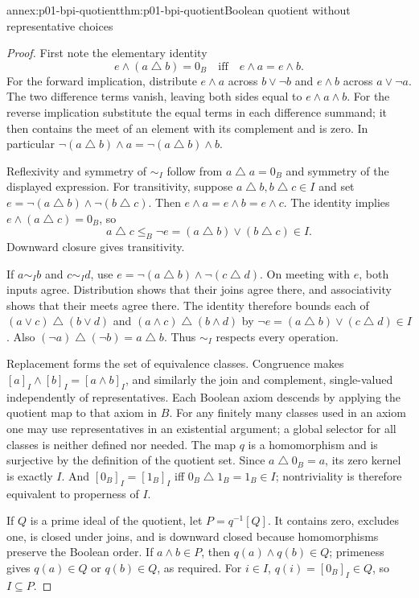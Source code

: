 \begin{annexitem}{annex:p01-bpi-quotient}{thm:p01-bpi-quotient}{Boolean quotient without representative choices}
\begin{proof}
First note the elementary identity
\[
 e\wedge(a\mathbin{\triangle}b)=0_B
 \quad\text{iff}\quad e\wedge a=e\wedge b.
\]
For the forward implication, distribute \(e\wedge a\) across
\(b\vee\neg b\) and \(e\wedge b\) across \(a\vee\neg a\).
The two difference terms vanish, leaving both sides equal to
\(e\wedge a\wedge b\). For the reverse implication substitute the
equal terms in each difference summand; it then contains the meet of an
element with its complement and is zero. In particular
\(\neg(a\mathbin{\triangle}b)\wedge a
=\neg(a\mathbin{\triangle}b)\wedge b\).

Reflexivity and symmetry of \(\sim_I\) follow from
\(a\mathbin{\triangle}a=0_B\) and symmetry of the displayed
expression. For transitivity, suppose
\(a\mathbin{\triangle}b,b\mathbin{\triangle}c\in I\) and set
\(e=\neg(a\mathbin{\triangle}b)\wedge
       \neg(b\mathbin{\triangle}c)\).
Then \(e\wedge a=e\wedge b=e\wedge c\). The identity implies
\(e\wedge(a\mathbin{\triangle}c)=0_B\), so
\[
 a\mathbin{\triangle}c\leq_B\neg e
  =(a\mathbin{\triangle}b)\vee(b\mathbin{\triangle}c)\in I.
\]
Downward closure gives transitivity.

If \(a\sim_I b\) and \(c\sim_I d\), use
\(e=\neg(a\mathbin{\triangle}b)\wedge
       \neg(c\mathbin{\triangle}d)\).
On meeting with \(e\), both inputs agree. Distribution shows that their
joins agree there, and associativity shows that their meets agree there.
The identity therefore bounds each of
\((a\vee c)\mathbin{\triangle}(b\vee d)\) and
\((a\wedge c)\mathbin{\triangle}(b\wedge d)\) by
\(\neg e=(a\mathbin{\triangle}b)\vee(c\mathbin{\triangle}d)\in I\).
Also \((\neg a)\mathbin{\triangle}(\neg b)=a\mathbin{\triangle}b\).
Thus \(\sim_I\) respects every operation.

Replacement forms the set of equivalence classes. Congruence makes
\([a]_I\wedge[b]_I=[a\wedge b]_I\), and similarly the join and
complement, single-valued independently of representatives. Each Boolean
axiom descends by applying the quotient map to that axiom in \(B\).
For any finitely many classes used in an axiom one may use representatives
in an existential argument; a global selector for all classes is neither
defined nor needed. The map \(q\) is a homomorphism and is surjective
by the definition of the quotient set. Since
\(a\mathbin{\triangle}0_B=a\), its zero kernel is exactly \(I\).
And \([0_B]_I=[1_B]_I\) iff
\(0_B\mathbin{\triangle}1_B=1_B\in I\); nontriviality is therefore
equivalent to properness of \(I\).

If \(Q\) is a prime ideal of the quotient, let \(P=q^{-1}[Q]\).
It contains zero, excludes one, is closed under joins, and is downward
closed because homomorphisms preserve the Boolean order. If
\(a\wedge b\in P\), then \(q(a)\wedge q(b)\in Q\);
primeness gives \(q(a)\in Q\) or \(q(b)\in Q\), as required.
For \(i\in I\), \(q(i)=[0_B]_I\in Q\), so \(I\subseteq P\).
\end{proof}
\end{annexitem}

